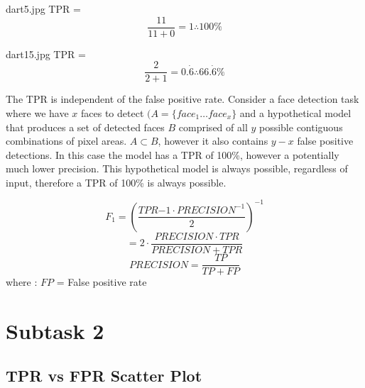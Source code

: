 \documentclass[conference]{IEEEtran}
\begin{document}
dart5.jpg TPR = 
\[\frac{11}{11+0} = 1 \therefore 100\%\]

dart15.jpg TPR = 
\[\frac{2}{2+1} = 0.\dot{6} \therefore 66.\dot{6}\%\]


The TPR is independent of the false positive rate. Consider a face detection task where we have $x$ faces to detect $(A = \{face_{1} \ldots face_{x}\}$ and a hypothetical model that produces a set of detected faces $B$ comprised of all $y$ possible contiguous combinations of pixel areas. $A \subset B$, however it also contains $y-x$ false positive detections. In this case the model has a TPR of 100\%, however a potentially much lower precision. This hypothetical model is always possible, regardless of input, therefore a TPR of 100\% is always possible.



$$F_{1} = \left(\frac{TPR{-1} \cdot PRECISION^{-1}}{2} \right) ^{-1}$$
$$= 2 \cdot \frac{PRECISION \cdot TPR}{PRECISION + TPR}$$
$$ PRECISION = \frac{TP}{TP + FP}$$
where :
$FP$ = False positive rate

\newpage

\section{Subtask 2}

\subsection{TPR vs FPR Scatter Plot}

\begin{center}
\end{center}
\end{document}
